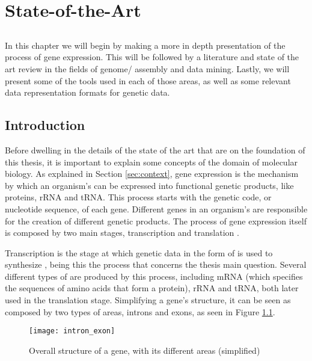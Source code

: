 \chapter{State-of-the-Art} \label{chap:sota}

\section*{}

In this chapter we will begin by making a more in depth presentation of the
process of gene expression. This will be followed by a literature and state of
the art review in the fields of genome/\trans{} assembly and data mining.
Lastly, we will present some of the tools used in each of those areas, as well
as some relevant data representation formats for genetic data.

\section{Introduction}

Before dwelling in the details of the state of the art that are on the
foundation of this thesis, it is important to explain some concepts of the
domain of molecular biology. As explained in Section \ref{sec:context}, gene
expression is the mechanism by which an organism's \dna{} can be expressed into
functional genetic products, like proteins, rRNA and tRNA. This process starts
with the genetic code, or nucleotide sequence, of each gene. Different genes in
an organism's \dna{} are responsible for the creation of different genetic
products. The process of gene expression itself is composed by two main stages,
transcription and translation \cite{leic:gene_expr}.

Transcription is the stage at which genetic data in the form of \dna{} is used
to synthesize \rna{}, being this the process that concerns the thesis main
question. Several different types of \rna{} are produced by this process,
including mRNA (which specifies the sequences of amino acids that form a
protein), rRNA and tRNA, both later used in the translation stage. Simplifying a
gene's structure, it can be seen as composed by two types of areas, introns and
exons, as seen in Figure \ref{fig:intron_exon}.

\begin{figure}[!htb]
  \begin{center}
    \leavevmode
    \texttt{[image: intron\_exon]}
    \caption{Overall structure of a gene, with its different areas (simplified)}
    \label{fig:intron_exon}
  \end{center}
\end{figure}

